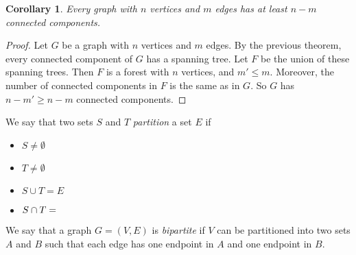 \documentclass[openany]{report}
\newtheorem{corollary}{Corollary}[section]
\begin{document}
\begin{corollary}
    Every graph with $n$ vertices and $m$ edges has at least $n-m$ connected components.
\end{corollary}
\begin{proof}
    Let $G$ be a graph with $n$ vertices and $m$ edges. By the previous theorem, every connected component of $G$ has a spanning tree. Let $F$ be the union of these spanning trees. Then $F$ is a forest with $n$ vertices, and $m' \leq m$. Moreover, the number of connected components in $F$ is the same as in $G$. So $G$ has $n - m' \geq n -m$ connected components.
\end{proof}
We say that two sets $S$ and $T$ \emph{partition} a set $E$ if 
\begin{itemize}
    \item $S \neq \emptyset$
    \item $T \neq \emptyset$
    \item $S \cup T = E$
    \item $S \cap T = \empty$ 
\end{itemize}
We say that a graph $G = (V, E)$ is \emph{bipartite} if $V$ can be partitioned into two sets $A$ and $B$ such that each edge has one endpoint in $A$ and one endpoint in $B$.
\end{document}
